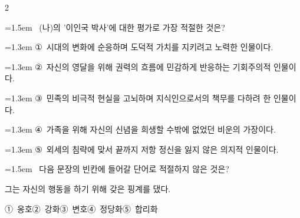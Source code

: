 \documentclass[10pt, a4paper]{article}
\begin{document}
\begin{multicols}{2}
\noindent\begin{minipage}{\columnwidth}
\vspace{2mm}
{\hangindent=1.5em  ~(나)의 '이인국 박사'에 대한 평가로 가장 적절한 것은?\par}

\vspace{0.5mm}
{\hangindent=1.3em  \noindent\hspace{0.3em}①~시대의 변화에 순응하며 도덕적 가치를 지키려고 노력한 인물이다.\par}
{\hangindent=1.3em  \noindent\hspace{0.3em}②~자신의 영달을 위해 권력의 흐름에 민감하게 반응하는 기회주의적 인물이다.\par}
{\hangindent=1.3em  \noindent\hspace{0.3em}③~민족의 비극적 현실을 고뇌하며 지식인으로서의 책무를 다하려 한 인물이다.\par}
{\hangindent=1.3em  \noindent\hspace{0.3em}④~가족을 위해 자신의 신념을 희생할 수밖에 없었던 비운의 가장이다.\par}
{\hangindent=1.3em  \noindent\hspace{0.3em}⑤~외세의 침략에 맞서 끝까지 저항 정신을 잃지 않은 의지적 인물이다.\par}
\vspace{4mm}
\end{minipage}
\par

\noindent\begin{minipage}{\columnwidth}
\vspace{2mm}
{\hangindent=1.5em  ~다음 문장의 빈칸에 들어갈 단어로 적절하지 않은 것은?\par}

\vspace{1mm}
\begin{boxibox}
그는 자신의 행동을 \underline{\hspace{3cm}}하기 위해 갖은 핑계를 댔다. \\
\end{boxibox}
\vspace{1mm}

\vspace{0.5mm}
\noindent
\mbox{①~옹호}\hspace{1em}\mbox{②~강화}\hspace{1em}\mbox{③~변호}\hspace{1em}\mbox{④~정당화}\hspace{1em}\mbox{⑤~합리화}


\end{minipage}
\end{multicols}
\end{document}
